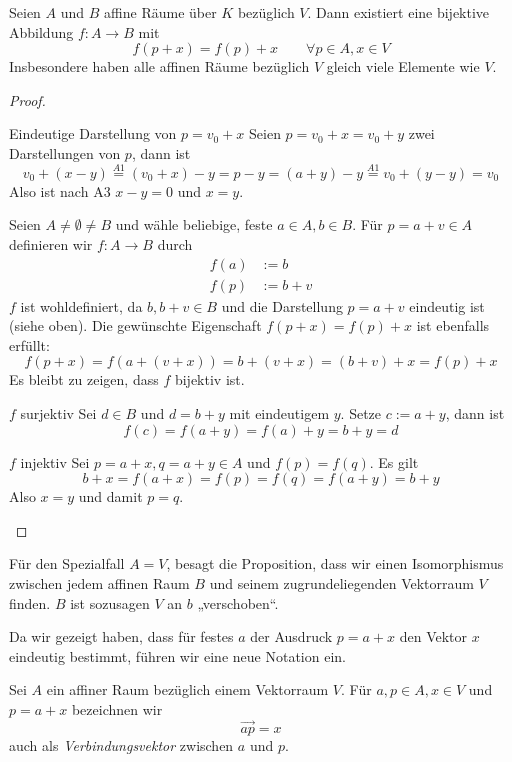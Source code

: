 \documentclass[a4paper, 10pt]{scrbook}
\begin{document}
\begin{prop} 
	\label{prop:8.4}
Seien $A$ und $B$ affine Räume über $K$ bezüglich $V$.
Dann existiert eine bijektive Abbildung $f:A\rightarrow B$ mit 
\[
	f(p+x) = f(p)+x \qquad \forall p\in A, x\in V
\]
Insbesondere haben alle affinen Räume bezüglich $V$ gleich viele Elemente wie $V$.
\begin{proof}
	\begin{seg}{Eindeutige Darstellung von $p=v_0+x$}
		Seien $p=v_0+x=v_0+y$ zwei Darstellungen von $p$, dann ist
		\[
			v_0+(x-y) \stackrel{A1}= (v_0+x)-y = p-y = (a+y)-y \stackrel{A1}= v_0+(y-y) = v_0
		\]
		Also ist nach A3 $x-y=0$ und $x=y$.
	\end{seg}
	Seien $A\neq \emptyset \neq B$ und wähle beliebige, feste $a\in A, b\in B$.
	Für $p=a+v\in A$ definieren wir $f:A\to B$ durch
	\begin{align*}
		f(a) &:= b\\
		f(p) &:= b +v
	\end{align*}
	$f$ ist wohldefiniert, da $b,b+v\in B$ und die Darstellung $p=a+v$ eindeutig ist (siehe oben).
	Die gewünschte Eigenschaft $f(p+x)=f(p)+x$ ist ebenfalls erfüllt:
	\[
		f(p+x) = f(a+(v+x)) = b + (v+x) = (b+v)+x = f(p) + x
	\]
	Es bleibt zu zeigen, dass $f$ bijektiv ist.

	\begin{seg}{$f$ surjektiv}
		Sei $d\in B$ und $d=b+y$ mit eindeutigem $y$.
		Setze $c := a+y$, dann ist
		\[
			f(c) = f(a+y) = f(a)+y = b+y = d
		\]
	\end{seg}
	\begin{seg}{$f$ injektiv}
		Sei $p=a+x,q=a+y\in A$ und $f(p)=f(q)$.
		Es gilt
		\[
			b + x = f(a+x) = f(p) = f(q) = f(a+y) = b+y
		\]
		Also $x=y$ und damit $p=q$.
	\end{seg}
\end{proof}
\begin{note}
	Für den Spezialfall $A=V$, besagt die Proposition, dass wir einen Isomorphismus zwischen jedem affinen Raum $B$ und seinem zugrundeliegenden Vektorraum $V$ finden.
	$B$ ist sozusagen $V$ an $b$ „verschoben“.
\end{note}
\end{prop}

Da wir gezeigt haben, dass für festes $a$ der Ausdruck $p=a+x$ den Vektor $x$ eindeutig bestimmt, führen wir eine neue Notation ein.

\begin{df*}
	Sei $A$ ein affiner Raum bezüglich einem Vektorraum $V$.
	Für $a,p\in A, x\in V$ und $p=a+x$ bezeichnen wir
	\[
		\vec{ap} = x
	\]
	auch als \emph{Verbindungsvektor} zwischen $a$ und $p$.
\end{df*}
\end{document}
